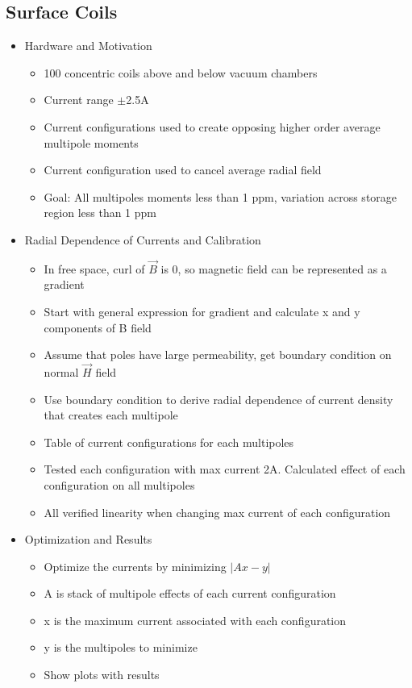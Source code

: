 \subsection{Surface Coils}
\begin{itemize}
  \item Hardware and Motivation
      \begin{itemize}
          \item 100 concentric coils above and below vacuum chambers
          \item Current range $\pm$2.5A 
          \item Current configurations used to create opposing higher order average multipole moments
          \item Current configuration used to cancel average radial field
          \item Goal: All multipoles moments less than 1 ppm, variation across storage region less than 1 ppm
      \end{itemize}
  \item Radial Dependence of Currents and Calibration
      \begin{itemize}
          \item In free space, curl of $\vec{B}$ is 0, so magnetic field can be represented as a gradient
          \item Start with general expression for gradient and calculate x and y components of B field
          \item Assume that poles have large permeability, get boundary condition on normal $\vec{H}$ field
          \item Use boundary condition to derive radial dependence of current density that creates each multipole
          \item Table of current configurations for each multipoles
          \item Tested each configuration with max current 2A. Calculated effect of each configuration on all multipoles
          \item All verified linearity when changing max current of each configuration
      \end{itemize}
  \item Optimization and Results
      \begin{itemize}
          \item Optimize the currents by minimizing $|Ax-y|$
          \item A is stack of multipole effects of each current configuration
          \item x is the maximum current associated with each configuration
          \item y is the multipoles to minimize
          \item Show plots with results
      \end{itemize}
\end{itemize}


